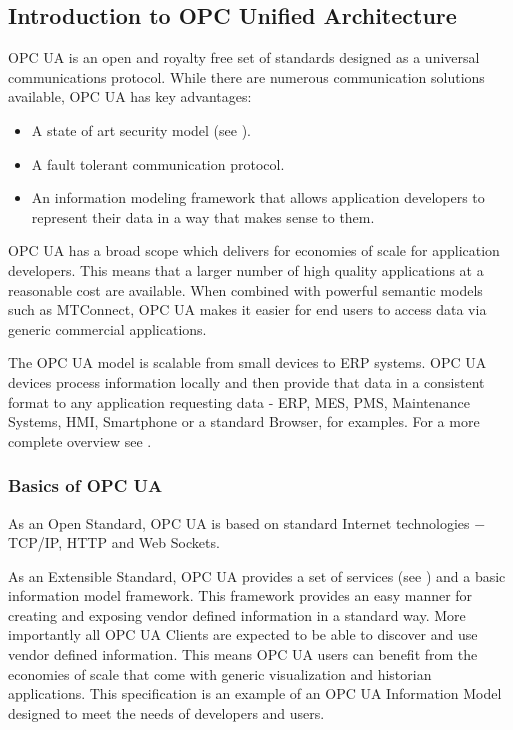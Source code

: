 \subsection{Introduction to OPC Unified Architecture}

OPC UA is an open and royalty free set of standards designed as a universal communications protocol.
While there are numerous communication solutions available, OPC UA has key advantages:

\begin{itemize}
\item A state of art security model (see \cite{UAPart2}).
\item A fault tolerant communication protocol.
\item An information modeling framework that allows application developers to represent their data in a way that makes sense to them.
\end{itemize}

OPC UA has a broad scope which delivers for economies of scale for application developers. This means that a larger number of high quality applications at a reasonable cost are available. When combined with powerful semantic models such as MTConnect, OPC UA makes it easier for end users to access data via generic commercial applications.

The OPC UA model is scalable from small devices to ERP systems. OPC UA devices process information locally and then provide that data in a consistent format to any application requesting data - ERP, MES, PMS, Maintenance Systems, HMI, Smartphone or a standard Browser, for examples. For a more complete overview see \cite{UAPart1}.

\subsubsection{Basics of OPC UA}

As an Open Standard, OPC UA is based on standard Internet technologies $-$ TCP/IP, HTTP and Web Sockets.

As an Extensible Standard, OPC UA provides a set of services (see \cite{UAPart4}) and a basic information model framework. This framework provides an easy manner for creating and exposing vendor defined information in a standard way. More importantly all OPC UA Clients are expected to be able to discover and use vendor defined information. This means OPC UA users can benefit from the economies of scale that come with generic visualization and historian applications. This specification is an example of an OPC UA Information Model designed to meet the needs of developers and users.

